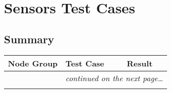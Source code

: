 
\section{Sensors Test Cases}
\subsection{Summary}

\begin{center}
\setlongtables
\begin{longtable}{|l|l|l|}
\hline
\textbf{Node Group} & \textbf{Test Case} & \textbf{Result} \\
\hline\hline
\endhead
 & \multicolumn{2}{|r|}{\textsl{continued on the next page\ldots}} \\
\hline
\endfoot
\hline
\endlastfoot
& & \\
\cline{2-3}
\end{longtable}
\end{center}
